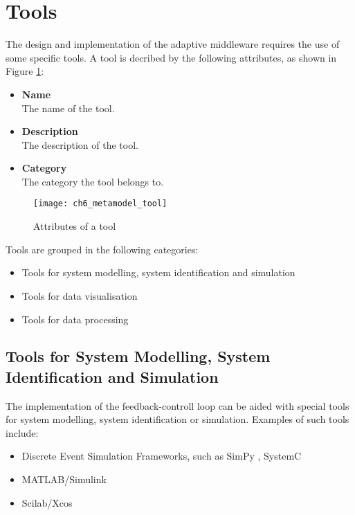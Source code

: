 \section{Tools} %
\label{sec:ch6_tools}

The design and implementation of the adaptive middleware requires the use of some specific tools. A tool is decribed by the following attributes, as shown in Figure \ref{fig:ch6_metamodel_tool}:
\begin{itemize}
	\item \textbf{Name}\\
	The name of the tool.
	\item \textbf{Description}\\
	The description of the tool.
	\item \textbf{Category}\\
	The category the tool belongs to.
\end{itemize}

\begin{figure}[htpb] \centering 
	\texttt{[image: ch6\_metamodel\_tool]} 
	\caption{Attributes of a tool} 
	\label{fig:ch6_metamodel_tool} 
\end{figure}

Tools are grouped in the following categories:

\begin{itemize}
	\item Tools for system modelling, system identification and simulation
	\item Tools for data visualisation
	\item Tools for data processing
\end{itemize}

\subsection{Tools for System Modelling, System Identification and Simulation}

The implementation of the feedback-controll loop can be aided with special tools for system modelling, system identification or simulation.
Examples of such tools include:

\begin{itemize}
	\item Discrete Event Simulation Frameworks, such as SimPy \citep{simpy}, SystemC \citep{systemc}
	\item MATLAB/Simulink \citep{matlab}
	\item Scilab/Xcos \citep{scilab}
\end{itemize}

